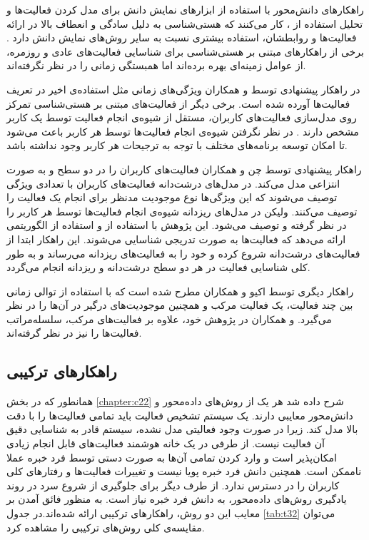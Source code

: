 راهکارهای دانش‌محور با استفاده از ابزارهای نمایش دانش برای مدل کردن فعالیت‌ها و تحلیل استفاده از ، کار می‌کنند که هستی‌شناسی به دلیل سادگی و انعطاف بالا در ارائه فعالیت‌ها و روابطشان، استفاده بیشتری نسبت به سایر روش‌های نمایش دانش دارد \cite{x3228}.
برخی از راهکارهای مبتنی بر هستی‌شناسی برای شناسایی فعالیت‌های عادی و روزمره، از عوامل زمینه‌ای بهره برده‌اند \cite{x3227,x3229,x322a} اما همبستگی زمانی را در نظر نگرفته‌اند. 

در راهکار پیشنهادی توسط  و همکاران \cite{x322b} ویژگی‌های زمانی مثل استفاده‌ی اخیر در تعریف فعالیت‌ها آورده شده است.
برخی دیگر از فعالیت‌های مبتنی بر هستی‌شناسی تمرکز روی مدل‌سازی فعالیت‌های کاربران، مستقل از شیوه‌ی انجام فعالیت توسط یک کاربر مشخص دارند \cite{x322c,x322d,x322e,x322f}. در نظر نگرفتن شیوه‌ی انجام فعالیت‌ها توسط هر کاربر باعث می‌شود تا امکان توسعه برنامه‌های مختلف با توجه به ترجیحات هر کاربر وجود نداشته باشد.

راهکار پیشنهادی توسط چن و همکاران \cite{x3227} فعالیت‌های کاربران را در دو سطح  و  به صورت انتزاعی مدل می‌کند. در مدل‌های درشت‌دانه فعالیت‌های کاربران با تعدادی ویژگی توصیف می‌شوند که این ویژگی‌ها نوع موجودیت‌ مدنظر برای انجام یک فعالیت را توصیف می‌کنند. ولیکن در مدل‌های ریزدانه شیوه‌ی انجام فعالیت‌ها توسط هر کاربر را در نظر گرفته و توصیف می‌شود. این پژوهش با استفاده از  و استفاده از  الگوریتمی ارائه می‌دهد که فعالیت‌ها به صورت تدریجی شناسایی می‌شوند. این راهکار ابتدا از فعالیت‌های درشت‌دانه شروع کرده و خود را به فعالیت‌های ریزدانه می‌رساند و به طور کلی شناسایی فعالیت در هر دو سطح درشت‌دانه و ریزدانه انجام می‌گردد.

راهکار دیگری توسط اکیو و همکاران \cite{x322e} مطرح شده است که با استفاده از توالی زمانی بین چند فعالیت، یک فعالیت مرکب و همچنین موجودیت‌های درگیر در آن‌ها را در نظر می‌گیرد.  و همکاران \cite{x322f} در پژوهش خود، علاوه بر فعالیت‌های مرکب، سلسله‌مراتب فعالیت‌ها را نیز در نظر گرفته‌اند.

\subsection{راهکارهای ترکیبی}

همانطور که در بخش \ref{chapter:c22} شرح داده شد هر یک از روش‌های داده‌محور و دانش‌محور معایبی دارند. یک سیستم تشخیص فعالیت باید تمامی فعالیت‌ها را با دقت بالا مدل کند. زیرا در صورت وجود فعالیتی مدل نشده، سیستم قادر به شناسایی دقیق آن فعالیت نیست. از طرفی در یک خانه هوشمند فعالیت‌های قابل انجام زیادی امکان‌پذیر است و وارد کردن تمامی آن‌ها به صورت دستی توسط فرد خبره عملا ناممکن است. همچنین دانش فرد خبره پویا نیست و تغییرات فعالیت‌ها و رفتارهای کلی کاربران را در دسترس ندارد. از طرف دیگر برای جلوگیری از شروع سرد در روند یادگیری روش‌های داده‌محور، به دانش فرد خبره نیاز است. به منظور فائق آمدن بر معایب این دو روش، راهکارهای ترکیبی ارائه شده‌اند.در جدول \ref{tab:t32} می‌توان مقایسه‌ی کلی روش‌های ترکیبی را مشاهده کرد.

